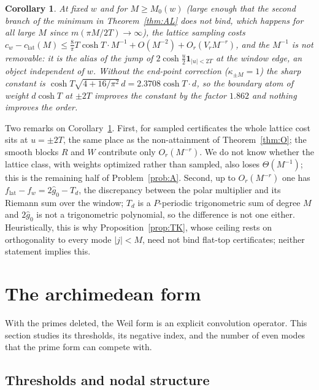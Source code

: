 \documentclass[11pt]{amsart}
\newtheorem{corollary}[theorem]{Corollary}
\theoremstyle{definition}
\theoremstyle{remark}
\newcommand{\gh}[1]{\widehat g_{#1}}
\begin{document}
\begin{corollary}\label{cor:ALdef}
At fixed $w$ and for $M\ge M_0(w)$ (large enough that the second branch of the minimum in
Theorem~\ref{thm:AL} does not bind, which happens for all large $M$ since $m(\pi M/2T)\to\infty$),
the lattice sampling costs
$c_w-c_{\mathrm{lat}}(M)\le\frac8\pi T\cosh T\cdot M^{-1}+O(M^{-2})+O_r(V_rM^{-r})$, and the
$M^{-1}$ is not removable: it is the alias of the jump of $2\cosh\frac u2\mathbf 1_{|u|<2T}$ at the
window edge, an object independent of $w$. Without the end-point correction
\textup{(}$\kappa_{\pm M}=1$\textup{)} the sharp constant is
$\cosh T\sqrt{4+16/\pi^2}\,d=2.3708\cosh T\cdot d$, so the boundary atom of weight $d\cosh T$ at
$\pm2T$ improves the constant by the factor $1.862$ and nothing improves the order.
\end{corollary}

Two remarks on Corollary~\ref{cor:ALdef}. First, for sampled certificates the whole lattice cost
sits at $u=\pm2T$, the same place as the non-attainment of Theorem~\ref{thm:O}; the smooth blocks $R$
and $W$ contribute only $O_r(M^{-r})$. We do not know whether the lattice class, with weights
optimized rather than sampled, also loses $\Theta(M^{-1})$; this is the remaining half of
Problem~\ref{prob:A}. Second, up to $O_r(M^{-r})$ one has $f_{\mathrm{lat}}-f_w=2\gh0-T_d$, the
discrepancy between the polar multiplier and its Riemann sum over the window; $T_d$ is a
$P$-periodic trigonometric sum of degree $M$ and $2\gh0$ is not a trigonometric polynomial, so the
difference is not one either. Heuristically, this is why Proposition~\ref{prop:TK}, whose ceiling
rests on orthogonality to every mode $|j|<M$, need not bind flat-top certificates; neither
statement implies this.

\section{The archimedean form}\label{sec:archstr}

With the primes deleted, the Weil form is an explicit convolution operator. This section studies
its thresholds, its negative index, and the number of even modes that the prime form can compete
with.

\subsection{Thresholds and nodal structure}\label{subsec:arch}
\end{document}
